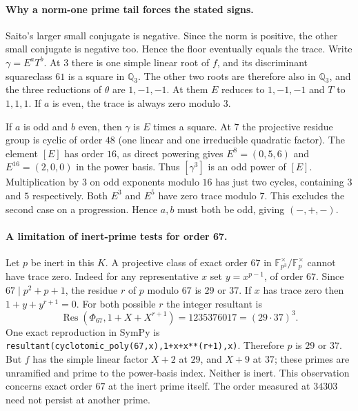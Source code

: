 \documentclass[11pt,a4paper,oneside,openany]{book}
\newcommand{\Q}{\mathbb Q}\newcommand{\C}{\mathbb C}\newcommand{\Z}{\mathbb Z}\newcommand{\F}{\mathbb F}\newcommand{\Tr}{\operatorname{Tr}}\newcommand{\Nm}{\operatorname{N}}\newcommand{\ord}{\operatorname{ord}}\newcommand{\K}{K}\newcommand{\OO}{\mathcal O_K}\newcommand{\unit}{\mathcal U}
\begin{document}
\paragraph{Why a norm-one prime tail forces the stated signs.}
Saito's larger small conjugate is negative. Since the norm is positive, the other small conjugate is negative too. Hence the floor eventually equals the trace. Write $\gamma=E^aT^b$. At $3$ there is one simple linear root of $f$, and its discriminant squareclass $61$ is a square in $\Q_3$. The other two roots are therefore also in $\Q_3$, and the three reductions of $\theta$ are $1,-1,-1$. At them $E$ reduces to $1,-1,-1$ and $T$ to $1,1,1$. If $a$ is even, the trace is always zero modulo $3$.

If $a$ is odd and $b$ even, then $\gamma$ is $E$ times a square. At $7$ the projective residue group is cyclic of order $48$ (one linear and one irreducible quadratic factor). The element $[E]$ has order $16$, as direct powering gives $E^8=(0,5,6)$ and $E^{16}=(2,0,0)$ in the power basis. Thus $[\gamma^3]$ is an odd power of $[E]$. Multiplication by $3$ on odd exponents modulo $16$ has just two cycles, containing $3$ and $5$ respectively. Both $E^3$ and $E^5$ have zero trace modulo $7$. This excludes the second case on a progression. Hence $a,b$ must both be odd, giving $(-,+,-)$.

\paragraph{A limitation of inert-prime tests for order 67.}
Let $p$ be inert in this $K$. A projective class of exact order $67$ in $\F_{p^3}^\times/\F_p^\times$ cannot have trace zero. Indeed for any representative $x$ set $y=x^{p-1}$, of order $67$. Since $67\mid p^2+p+1$, the residue $r$ of $p$ modulo $67$ is $29$ or $37$. If $x$ has trace zero then $1+y+y^{r+1}=0$. For both possible $r$ the integer resultant is
\[
  \operatorname{Res}(\Phi_{67},1+X+X^{r+1})
  =1235376017=(29\cdot37)^3 .
\]
One exact reproduction in SymPy is
\texttt{resultant(cyclotomic\_poly(67,x),1+x+x**(r+1),x)}.
Therefore $p$ is $29$ or $37$. But $f$ has the simple linear factor $X+2$ at $29$, and $X+9$ at $37$; these primes are unramified and prime to the power-basis index. Neither is inert. This observation concerns exact order $67$ at the inert prime itself. The order measured at $34303$ need not persist at another prime.
\end{document}
